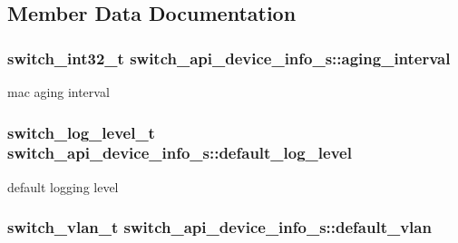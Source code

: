 \subsection{Member Data Documentation}
\hypertarget{structswitch__api__device__info__s_ad763fad91b193319f4b033f5250ab245}{
\subsubsection[{aging\+\_\+interval}]{\setlength{\rightskip}{0pt plus 5cm}switch\+\_\+int32\+\_\+t switch\+\_\+api\+\_\+device\+\_\+info\+\_\+s\+::aging\+\_\+interval}}\label{structswitch__api__device__info__s_ad763fad91b193319f4b033f5250ab245}
mac aging interval \hypertarget{structswitch__api__device__info__s_a46b4681cedb2ff5c0843a371640daf38}{
\subsubsection[{default\+\_\+log\+\_\+level}]{\setlength{\rightskip}{0pt plus 5cm}switch\+\_\+log\+\_\+level\+\_\+t switch\+\_\+api\+\_\+device\+\_\+info\+\_\+s\+::default\+\_\+log\+\_\+level}}\label{structswitch__api__device__info__s_a46b4681cedb2ff5c0843a371640daf38}
default logging level \hypertarget{structswitch__api__device__info__s_a355c7d6a12564d76a6d45f5cea341917}{
\subsubsection[{default\+\_\+vlan}]{\setlength{\rightskip}{0pt plus 5cm}switch\+\_\+vlan\+\_\+t switch\+\_\+api\+\_\+device\+\_\+info\+\_\+s\+::default\+\_\+vlan}}\label{structswitch__api__device__info__s_a355c7d6a12564d76a6d45f5cea341917}
